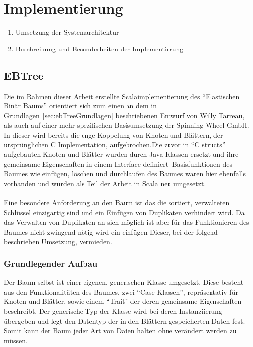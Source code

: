 \documentclass[a4paper,11pt,oneside,%
headsepline,												%
footsepline,												%
bibtotocnumbered									%
]{scrreprt}
\begin{document}
\chapter{Implementierung}
		\begin{enumerate}[1.]
			\item Umsetzung der Systemarchitektur
			\item Beschreibung und Besonderheiten der Implementierung
		\end{enumerate}

\section{EBTree} %
\label{sec:EbTreeImpl}
Die im Rahmen dieser Arbeit erstellte Scalaimplementierung des \enquote{Elastischen Binär Baums} orientiert sich zum einen an dem in Grundlagen~\ref{sec:ebTreeGrundlagen} beschriebenen Entwurf von Willy Tarreau\autocite{Tarreau}, als auch auf einer mehr spezifischen Basisumsetzung der Spinning Wheel GmbH.\\
In dieser wird bereits die enge Koppelung von Knoten und Blättern, der ursprünglichen C Implementation, aufgebrochen.Die zuvor in \enquote{C structs} aufgebauten Knoten und Blätter wurden durch Java Klassen ersetzt und ihre gemeinsame Eigenschaften in einem Interface definiert. Basisfunktionen des Baumes wie einfügen, löschen und durchlaufen des Baumes waren hier ebenfalls vorhanden und wurden als Teil der Arbeit in Scala neu umgesetzt.\\\\
Eine besondere Anforderung an den Baum ist das die sortiert, verwalteten Schlüssel einzigartig sind und ein Einfügen von Duplikaten verhindert wird. Da das Verwalten von Duplikaten an sich möglich ist aber für das Funktionieren des Baumes nicht zwingend nötig wird ein einfügen Dieser, bei der folgend beschrieben Umsetzung, vermieden. \\
\subsection{Grundlegender Aufbau}
Der Baum selbst ist einer eigenen, generischen Klasse umgesetzt. Diese besteht aus den Funktionalitäten des Baumes, zwei \enquote{Case-Klassen}, repräsentativ für Knoten und Blätter, sowie einem \enquote{Trait} der deren gemeinsame Eigenschaften beschreibt. Der generische Typ der Klasse wird bei deren Instanziierung übergeben und legt den Datentyp der in den Blättern gespeicherten Daten fest. Somit kann der Baum jeder Art von Daten halten ohne verändert werden zu müssen.\\
\end{document}
